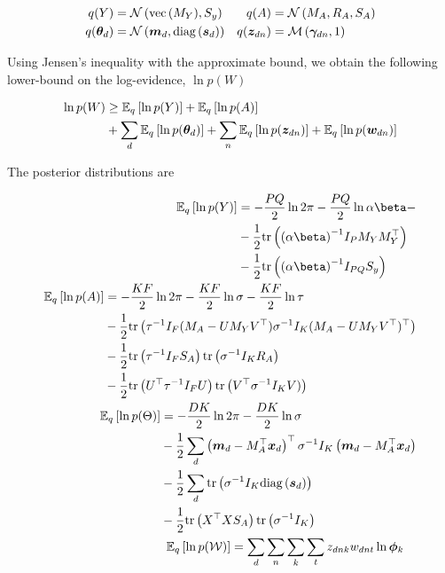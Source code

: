 \begin{equation}
\begin{split}
q(Y) &= \nor{\vecf{M_Y}}{S_y} &
q(A) &= \mnor{M_A}{R_A}{S_A} \\
q(\thd) &= \nor{\md}{\diag{\vv{s}_d}} &
q(\zdn) & = \muln{\gdn}{1} \\
\end{split}
\end{equation}


Using Jensen's inequality with the approximate bound, we obtain the following lower-bound on the log-evidence, $\ln p(W)$

\begin{equation}
\begin{split}
\ln p(W) 
&\geq \ex{\ln p(Y)}{q} + \ex{\ln p(A)}{q} \\
&+ \sum_d \ex{\ln p(\thd)}{q} + \sum_n \ex{\ln p(\zdn)}{q} + \ex{\ln p(\wdn)}{q}
\end{split}
\end{equation}

The posterior distributions are

\begin{align}
\begin{split}
\ex{\ln p(Y)}{q} 
    & = -\halve{PQ} \ln 2\pi - \halve{PQ} \ln \alpha \beta - \\
    & - \half \Tr{ \invb{\alpha \beta} I_P M_Y M_Y\T } \\
    & - \half \Tr{\invb{\alpha \beta} I_{PQ} S_y }
\end{split} \\
\begin{split}
\ex{\ln p(A)}{q} 
    & = -\halve{KF} \ln 2\pi - \halve{KF} \ln \sigma - \halve{KF} \ln \tau \\
    & - \half \Tr{ \inv{\tau} I_F (M_A - U M_Y V\T) \inv{\sigma} I_K (M_A - U M_Y V\T)\T } \\
    & - \half \Tr{ \inv{\tau} I_F S_A}\Tr{\inv{\sigma} I_K R_A} \\
    & - \half \Tr{ U\T \inv{\tau}I_F U}\Tr{ V\T \inv{\sigma} I_K V)}
\end{split} \\
\begin{split}
\ex{\ln p(\Theta)}{q} 
    & = -\halve{DK} \ln 2\pi - \halve{DK} \ln \sigma  \\
    & - \half \sum_d \left(\md - M_A\T \xd\right)\T \inv{\sigma} I_K \left(\md - M_A\T \xd\right) \\
    & - \half \sum_d \Tr{ \inv{\sigma} I_K \diag{\vv{s}_d}} \\
    & - \half \Tr{ X\T X S_A}\Tr{\inv{\sigma} I_K}
\end{split}\\
\begin{split}
\ex{\ln p(\mathcal{W})}{q} 
    & = \sum_d \sum_n \sum_k \sum_t \zdnk \wdnt \ln \pk
\end{split}
\end{align}

